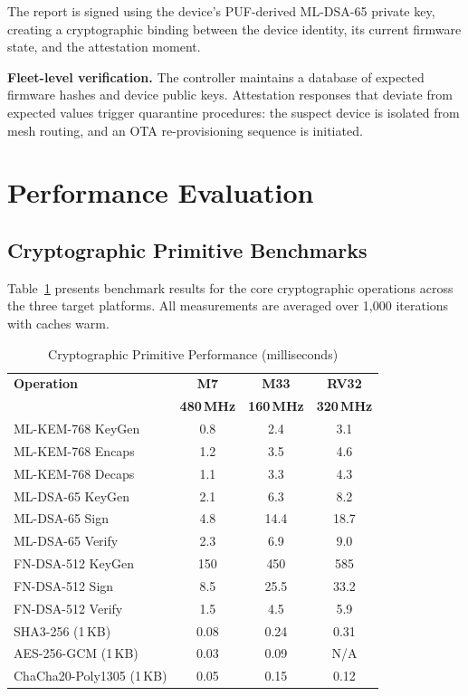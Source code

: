 \documentclass[conference,10pt]{IEEEtran}
\begin{document}
The report is signed using the device's PUF-derived ML-DSA-65 private key, creating a cryptographic binding between the device identity, its current firmware state, and the attestation moment.

\textbf{Fleet-level verification.} The controller maintains a database of expected firmware hashes and device public keys. Attestation responses that deviate from expected values trigger quarantine procedures: the suspect device is isolated from mesh routing, and an OTA re-provisioning sequence is initiated.

\section{Performance Evaluation}
\label{sec:evaluation}

\subsection{Cryptographic Primitive Benchmarks}

Table~\ref{tab:crypto_bench} presents benchmark results for the core cryptographic operations across the three target platforms. All measurements are averaged over 1,000 iterations with caches warm.

\begin{table}[t]
\centering
\caption{Cryptographic Primitive Performance (milliseconds)}
\label{tab:crypto_bench}
\begin{tabular}{lccc}
\toprule
\textbf{Operation} & \textbf{M7} & \textbf{M33} & \textbf{RV32} \\
 & \textbf{480\,MHz} & \textbf{160\,MHz} & \textbf{320\,MHz} \\
\midrule
ML-KEM-768 KeyGen & 0.8 & 2.4 & 3.1 \\
ML-KEM-768 Encaps & 1.2 & 3.5 & 4.6 \\
ML-KEM-768 Decaps & 1.1 & 3.3 & 4.3 \\
ML-DSA-65 KeyGen & 2.1 & 6.3 & 8.2 \\
ML-DSA-65 Sign & 4.8 & 14.4 & 18.7 \\
ML-DSA-65 Verify & 2.3 & 6.9 & 9.0 \\
FN-DSA-512 KeyGen & 150 & 450 & 585 \\
FN-DSA-512 Sign & 8.5 & 25.5 & 33.2 \\
FN-DSA-512 Verify & 1.5 & 4.5 & 5.9 \\
SHA3-256 (1\,KB) & 0.08 & 0.24 & 0.31 \\
AES-256-GCM (1\,KB) & 0.03 & 0.09 & N/A \\
ChaCha20-Poly1305 (1\,KB) & 0.05 & 0.15 & 0.12 \\
\bottomrule
\end{tabular}
\end{table}
\end{document}
